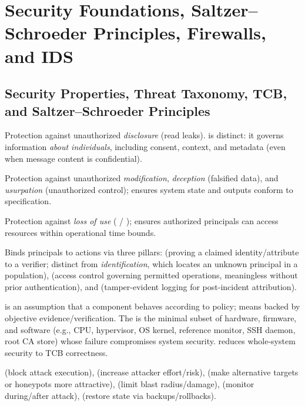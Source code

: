 \section{Security Foundations, Saltzer--Schroeder Principles, Firewalls, and IDS}

\subsection{Security Properties, Threat Taxonomy, TCB, and Saltzer--Schroeder Principles}
\begin{compactitem}
  \item {}
  \begin{compactitem}
    \item {} Protection against unauthorized \emph{disclosure} (read leaks).  is distinct: it governs information \emph{about individuals}, including consent, context, and metadata (even when message content is confidential).
    \item {} Protection against unauthorized \emph{modification}, \emph{deception} (falsified data), and \emph{usurpation} (unauthorized control); ensures system state and outputs conform to specification.
    \item {} Protection against \emph{loss of use} ( / ); ensures authorized principals can access resources within operational time bounds.
  \end{compactitem}
  \item {} Binds principals to actions via three pillars:  (proving a claimed identity/attribute to a verifier; distinct from \emph{identification}, which locates an unknown principal in a population),  (access control governing permitted operations, meaningless without prior authentication), and  (tamper-evident logging for post-incident attribution).
  \item {}  is an assumption that a component behaves according to policy;  means backed by objective evidence/verification. The  is the minimal subset of hardware, firmware, and software (e.g., CPU, hypervisor, OS kernel, reference monitor, SSH daemon, root CA store) whose failure compromises system security.  reduces whole-system security to TCB correctness.
  \item {}  (block attack execution),  (increase attacker effort/risk),  (make alternative targets or honeypots more attractive),  (limit blast radius/damage),  (monitor during/after attack),  (restore state via backups/rollbacks).
\end{compactitem}

